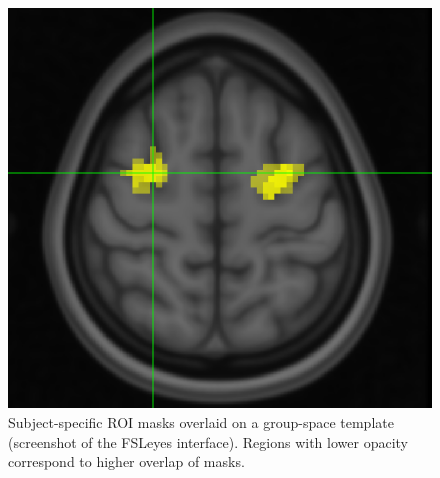 \documentclass[a4paper, 12pt]{scrreprt}
\begin{document}
\begin{figure}[H]
	\includegraphics[scale=0.35]{img/FEF_masks_overlaid_v2.png}
	\caption[]{\small{Subject-specific ROI masks overlaid on a group-space template (screenshot of the FSLeyes interface). Regions with lower opacity correspond to higher overlap of masks.}}
	\label{fig:FEF}
\end{figure}
\end{document}
